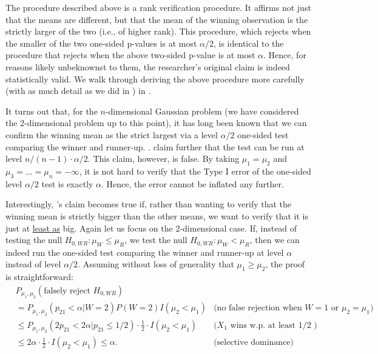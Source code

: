 \documentclass{article}
\begin{document}
The procedure described above is a rank verification procedure. It affirms not just that the means are different, but that the mean of the winning observation is the strictly larger of the two (i.e., of higher rank). This procedure, which rejects when the smaller of the two one-sided p-values is at most $\alpha/2$, is identical to the procedure that rejects when the above two-sided p-value is at most $\alpha$. Hence, for reasons likely unbeknownst to them, the researcher's original claim is indeed statistically valid. We walk through deriving the above procedure more carefully (with as much detail as we did in ) in .

It turns out that, for the $n$-dimensional Gaussian problem (we have considered the 2-dimensional problem up to this point), it has long been known that we can confirm the winning mean as the strict largest via a level $\alpha/2$ one-sided test comparing the winner and runner-up. \citep{Gutmann}. \cite{Hung2019} claim further that the test can be run at level $n/(n-1) \cdot \alpha/2$. This claim, however, is false. By taking $\mu_1 = \mu_2$ and $\mu_3 = \dots = \mu_n = -\infty$, it is not hard to verify that the Type I error of the one-sided level $\alpha/2$ test is exactly $\alpha$. Hence, the error cannot be inflated any further.  

Interestingly, \cite{Hung2019}'s claim becomes true if, rather than wanting to verify that the winning mean is strictly bigger than the other means, we want to verify that it is just at \underline{least as} big. Again let us focus on the 2-dimensional case. If, instead of testing the null $H_{0, WR}: \mu_W \leq \mu_R$, we test the null $H_{0, WR} :\mu_W < \mu_R$, then we can indeed run the one-sided test comparing the winner and runner-up at level $\alpha$ instead of level $\alpha/2$. Assuming without loss of generality that $\mu_1 \geq \mu_2$, the proof is straightforward:
\begin{align*}
    &P_{\mu_1, \mu_2}(\text{falsely reject } H_{0, WR}) &\\
    & =P_{\mu_1, \mu_2}(p_{21} < \alpha | W = 2)P(W=2)I(\mu_2 < \mu_1) & \text{(no false rejection when $W=1$ or $\mu_2 =\mu_1$)}\\
    &\leq P_{\mu_1, \mu_2}(2p_{21} < 2\alpha | p_{21} \leq 1/2)\cdot \frac{1}{2} \cdot I(\mu_2 < \mu_1) & \text{($X_1$ wins w.p. at least $1/2$ )}\\
    &\leq 2 \alpha \cdot \frac{1}{2} \cdot I(\mu_2 < \mu_1) \leq \alpha. & \text{(selective dominance)}
\end{align*}
\end{document}
